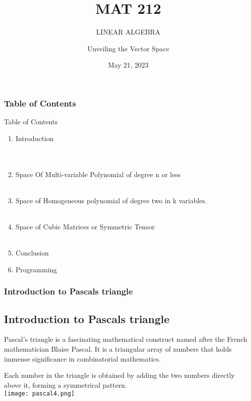 \documentclass{beamer}
\title[\color{white} LIEAR ALGEBRA] %
{MAT 212}
\subtitle{LINEAR ALGEBRA}
\author[MAT 212 ] %
{Unveiling the Vector Space}
\institute[University Of Ibadan]{University Of Ibadan}
\date[VLC 2021] %
{May 21, 2023}
\begin{document}
\frame{\titlepage}
\begin{frame}
\frametitle{Table of Contents}
\tableofcontents
\Large{Table of Contents}
\begin{enumerate}
    \item Introduction\\\\\\
    \item Space Of Multi-variable Polynomial of degree n or less\\\\
    \item Space of Homogeneous polynomial of degree two in k variables.\\\\
    \item Space of Cubic Matrices or Symmetric Tensor\\\\
    \item Conclusion
    \item Programming
\end{enumerate}
\end{frame}

\begin{frame}
    \frametitle{Introduction to Pascals triangle}
    \begin{block}
    \section{Introduction to Pascals triangle}
    Pascal's triangle is a fascinating mathematical construct named after the French mathematician Blaise Pascal. It is a triangular array of numbers that holds immense significance in combinatorial mathematics.
    
    Each number in the triangle is obtained by adding the two numbers directly above it, forming a symmetrical pattern.\\
    
\centering
\texttt{[image: pascal4.png]}
\end{block}
\end{frame}
\end{document}

